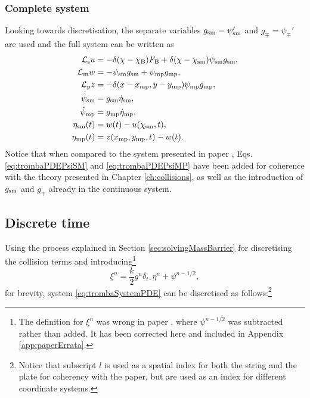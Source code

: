 \subsubsection{Complete system}
Looking towards discretisation, the separate variables $g_{\text{sm}}=\psi_{\text{sm}}'$ and $g_\mp=\psi_\mp'$ are used and the full system can be written as 
\begin{subequations}\label{eq:trombaSystemPDE}
    \begin{align}
        \mathcal{L}_\text{s}u &= -\delta(\chi-\chi_{\text{B}})F_{\text{B}} + \delta(\chi - \chi_{\text{sm}})\psi_{\text{sm}} g_{\text{sm}},\\
        \mathcal{L}_\text{m}w &= - \psi_{\text{sm}} g_{\text{sm}} + \psi_{\text{mp}} g_{\text{mp}},\\
        \mathcal{L}_\text{p}z &= -\delta(x-x_{\text{mp}}, y-y_{\text{mp}})\psi_{\text{mp}} g_{\text{mp}},\\
        \dot\psi_{\text{sm}} &= g_{\text{sm}} \dot \eta_{\text{sm}},\label{eq:trombaPDEPsiSM}\\
        \dot\psi_{\text{mp}} &= g_{\text{mp}} \dot \eta_{\text{mp}},\label{eq:trombaPDEPsiMP}\\
        \eta_{\text{sm}}(t) &= w(t) - u(\chi_{\text{sm}}, t),\\
        \eta_{\text{mp}}(t) &= z(x_{\text{mp}}, y_{\text{mp}}, t) - w(t).
    \end{align}
\end{subequations}
Notice that when compared to the system presented in paper \citeP[D], Eqs. \eqref{eq:trombaPDEPsiSM} and \eqref{eq:trombaPDEPsiMP} have been added for coherence with the theory presented in Chapter \ref{ch:collisions}, as well as the introduction of $g_{\text{sm}}$ and $g_\mp$ already in the continuous system.


\subsection{Discrete time}
Using the process explained in Section \ref{sec:solvingMassBarrier} for discretising the collision terms and introducing\footnote{The definition for $\xi^n$ was wrong in paper \citeP[D], where $\psi^{n-1/2}$ was subtracted rather than added. It has been corrected here and included in Appendix \ref{app:paperErrata}.} 
\begin{equation}
    \xi^n = \frac{k}{2}g^n\delta_{t\cdot}\eta^n + \psi^{n-1/2},
\end{equation}
for brevity, system \eqref{eq:trombaSystemPDE} can be discretised as follows:\footnote{Notice that subscript $l$ is used as a spatial index for both the string and the plate for coherency with the paper, but are used as an index for different coordinate systems.}

